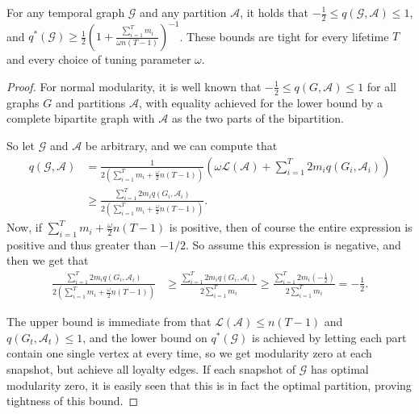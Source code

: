 \documentclass[runningheads]{llncs}
\newcommand{\cA}{\mathcal{A}}
\newcommand{\cG}{\mathcal{G}}
\newcommand{\loy}{\mathcal{L}}
\begin{document}
\begin{lemma}
    For any temporal graph $\cG$ and any partition $\cA$, it holds that $-\frac{1}{2} \leq q(\cG,\cA) \leq 1$, and $q^*(\cG) \geq \frac{1}{2}\left(1 + \frac{\sum_{i=1}^T m_i}{\omega n(T-1)}\right)^{-1}$. These bounds are tight for every lifetime $T$ and every choice of tuning parameter $\omega$.
\end{lemma}
\begin{proof}
    For normal modularity, it is well known that $-\frac{1}{2} \leq q(G,\cA) \leq 1$ for all graphs $G$ and partitions $\cA$, with equality achieved for the lower bound by a complete bipartite graph with $\cA$ as the two parts of the bipartition.

    So let $\cG$ and $\cA$ be arbitrary, and we can compute that
    \begin{align*}
        q(\cG,\cA) &= \frac{1}{2\left(\sum_{i=1}^T m_i + \frac{\omega}{2}n(T-1)\right)}\left(\omega \loy(\cA) + \sum_{i=1}^T 2m_iq(G_i,\cA_i)\right)\\
        &\geq \frac{\sum_{i=1}^T 2m_iq(G_i,\cA_i)}{2\left(\sum_{i=1}^T m_i + \frac{\omega}{2}n(T-1)\right)}.
    \end{align*}
    Now, if $\sum_{i=1}^T m_i + \frac{\omega}{2}n(T-1)$ is positive, then of course the entire expression is positive and thus greater than $-1/2$. So assume this expression is negative, and then we get that
    \begin{align*}
        \frac{\sum_{i=1}^T 2m_iq(G_i,\cA_i)}{2\left(\sum_{i=1}^T m_i + \frac{\omega}{2}n(T-1)\right)} & \geq \frac{\sum_{i=1}^T 2m_iq(G_i,\cA_i)}{2\sum_{i=1}^T m_i} \geq \frac{\sum_{i=1}^T 2m_i\left(-\frac{1}{2}\right)}{2\sum_{i=1}^T m_i} = -\frac{1}{2}.
    \end{align*}

    The upper bound is immediate from that $\loy(\cA) \leq n(T-1)$ and $q(G_t,\cA_t) \leq 1$, and the lower bound on $q^*(\cG)$ is achieved by letting each part contain one single vertex at every time, so we get modularity zero at each snapshot, but achieve all loyalty edges. If each snapshot of $\cG$ has optimal modularity zero, it is easily seen that this is in fact the optimal partition, proving tightness of this bound.


\end{proof}
\end{document}
